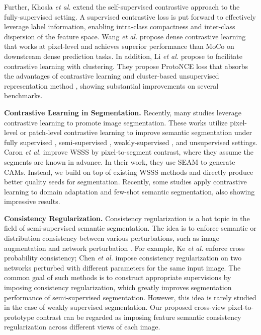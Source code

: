\documentclass[10pt,twocolumn,letterpaper]{article}
\begin{document}
Further, Khosla \textit{et al.} \cite{khosla2020supervisedCL} extend the self-supervised contrastive approach to the fully-supervised setting. 
A supervised contrastive loss is put forward to effectively leverage label information, enabling intra-class compactness and inter-class dispersion of the feature space.
Wang \textit{et al.} \cite{wang2021denseCL} propose dense contrastive learning that works at pixel-level and achieves superior performance than MoCo on downstream dense prediction tasks.
In addition, Li \textit{et al.} \cite{prototypeCL} propose to facilitate contrastive learning with clustering.
They propose ProtoNCE loss that absorbs the advantages of contrastive learning and cluster-based unsupervised representation method \cite{tian2017deepcluster}, showing substantial improvements on several benchmarks.  











\noindent \textbf{Contrastive Learning in Segmentation.}
Recently, many studies leverage contrastive learning to promote image segmentation.
These works utilize pixel-level or patch-level contrastive learning to improve semantic segmentation under fully supervised \cite{wang2021exploring_fully_supervised}, semi-supervised \cite{alonso2021semi1}, weakly-supervised \cite{SPML}, and unsupervised \cite{van2021unsupervised1} settings.
Caron \textit{et al.} \cite{SPML} improve WSSS by pixel-to-segment contrast, where they assume the segments are known in advance. In their work, they use SEAM to generate CAMs.
Instead, we build on top of existing WSSS methods and directly produce better quality seeds for segmentation.
Recently, some studies apply contrastive learning to domain adaptation \cite{liu2021domain1} and few-shot \cite{liu2021fewshot1} semantic segmentation, also showing impressive results.


\noindent \textbf{Consistency Regularization.}
Consistency regularization is a hot topic in the field of semi-supervised semantic segmentation.
The idea is to enforce semantic or distribution consistency between various perturbations, such as image augmentation \cite{ke2020guidedKe} and network perturbation \cite{zhang2020wcp, chen2021semiCPC}.
For example, Ke \textit{et al.} \cite{ke2020guidedKe} enforce cross probability consistency; Chen \textit{et al.} \cite{chen2021semiCPC} impose consistency regularization on two networks perturbed with different parameters for the same input image.
The common goal of such methods is to construct appropriate supervisions by imposing consistency regularization, which greatly improves segmentation performance of semi-supervised segmentation. 
However, this idea is rarely studied in the case of weakly supervised segmentation.
Our proposed cross-view pixel-to-prototype contrast can be regarded as imposing feature semantic consistency regularization across different views of each image.
\end{document}

